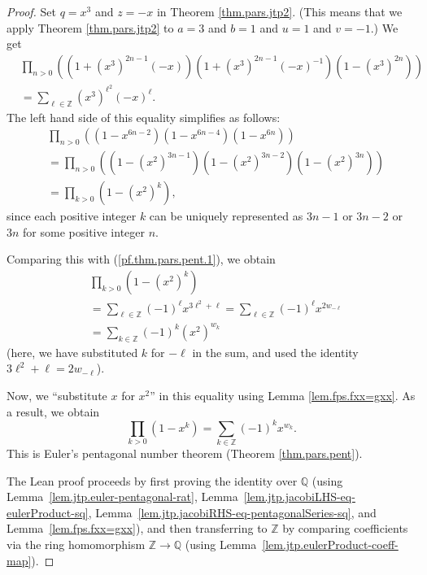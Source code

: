 \begin{proof}
Set $q=x^{3}$ and $z=-x$ in Theorem \ref{thm.pars.jtp2}. (This means that we apply
Theorem \ref{thm.pars.jtp2} to $a=3$ and $b=1$ and $u=1$ and $v=-1$.) We get
\begin{align}
&  \prod_{n>0}\left(  \left(  1+\left(  x^{3}\right)  ^{2n-1}\left(
-x\right)  \right)  \left(  1+\left(  x^{3}\right)  ^{2n-1}\left(  -x\right)
^{-1}\right)  \left(  1-\left(  x^{3}\right)  ^{2n}\right)  \right)
\nonumber\\
&  =\sum_{\ell\in\mathbb{Z}}\left(  x^{3}\right)  ^{\ell^{2}}\left(
-x\right)  ^{\ell}. \label{pf.thm.pars.pent.1}
\end{align}
The left hand side of this equality simplifies as follows:
\begin{align*}
&  \prod_{n>0}\left(  \left(  1-x^{6n-2}\right)  \left(
1-x^{6n-4}\right)  \left(  1-x^{6n}\right)  \right) \\
&  =\prod_{n>0}\left(  \left(  1-\left(  x^{2}\right)
^{3n-1}\right)  \left(  1-\left(  x^{2}\right)
^{3n-2}\right)  \left(  1-\left(  x^{2}\right)
^{3n}\right)  \right) \\
&  =\prod_{k>0}\left(  1-\left(  x^{2}\right)  ^{k}\right)  ,
\end{align*}
since each positive integer $k$ can be uniquely represented as $3n-1$ or
$3n-2$ or $3n$ for some positive integer $n$.

Comparing this with (\ref{pf.thm.pars.pent.1}), we obtain
\begin{align}
&  \prod_{k>0}\left(  1-\left(  x^{2}\right)  ^{k}\right) \nonumber\\
&  =\sum_{\ell\in\mathbb{Z}}\left(  -1\right)  ^{\ell}x^{3\ell
^{2}+\ell}=\sum_{\ell\in\mathbb{Z}}\left(  -1\right)  ^{\ell}x^{2w_{-\ell}} \nonumber\\
&  =\sum_{k\in\mathbb{Z}}\left(  -1\right)  ^{k}\left(  x^{2}\right)  ^{w_{k}}
\label{pf.thm.pars.pent.2}
\end{align}
(here, we have substituted $k$ for $-\ell$ in the sum, and used the
identity $3\ell^{2}+\ell = 2w_{-\ell}$).

Now, we ``substitute $x$ for $x^{2}$'' in
this equality using Lemma \ref{lem.fps.fxx=gxx}. As a result, we obtain
\[
\prod_{k>0}\left(  1-x^{k}\right)  =\sum_{k\in\mathbb{Z}}\left(  -1\right)
^{k}x^{w_{k}}.
\]
This is Euler's pentagonal number theorem (Theorem \ref{thm.pars.pent}).

The Lean proof proceeds by first proving the identity over $\mathbb{Q}$
(using Lemma~\ref{lem.jtp.euler-pentagonal-rat},
Lemma~\ref{lem.jtp.jacobiLHS-eq-eulerProduct-sq},
Lemma~\ref{lem.jtp.jacobiRHS-eq-pentagonalSeries-sq}, and
Lemma~\ref{lem.fps.fxx=gxx}), and then transferring to $\mathbb{Z}$
by comparing coefficients via the ring homomorphism $\mathbb{Z}\to\mathbb{Q}$
(using Lemma~\ref{lem.jtp.eulerProduct-coeff-map}).
\end{proof}

